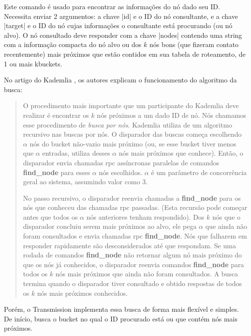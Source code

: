 
\newpage
{}

Este comando é usado para encontrar as informações do nó dado seu ID. Necessita enviar 2
argumentos: a chave \bverb|id| e o ID do nó consultante, e a chave \bverb|target| e o ID
do nó cujas informações o consultante está procurando (ou nó alvo). O nó consultado
deve responder com a chave \bverb|nodes| contendo uma \gls*{string} com a informação
compacta do nó alvo ou dos $k$ nós bons (que fizeram contato recentemente) mais
próximos que estão contidos em sua tabela de roteamento, de 1 ou mais \glspl*{kbucket}.

No artigo do Kademlia \cite{artigo:kademlia}, os autores explicam o funcionamento do
algoritmo da busca:

\blockquote{O procedimento mais importante que um participante do Kademlia deve realizar
é encontrar os $k$ nós próximos a um dado ID de nó. Nós chamamos esse procedimento de
\emph{busca por nós}. Kademlia utiliza de um algoritmo recursivo nas buscas por nós. O
disparador das buscas começa escolhendo $\alpha$ nós do \gls*{bucket} não-vazio mais
próximo (ou, se esse \gls*{bucket} tiver menos que $\alpha$ entradas, utiliza desses
$\alpha$ nós mais próximos que conhece). Então, o disparador envia chamadas \gls*{rpc}
assíncronas paralelas de comandos \textbf{find\_node} para esses $\alpha$ nós
escolhidos. $\alpha$ é um parâmetro de concorrência geral ao sistema, assumindo valor
como 3.

No passo recursivo, o disparador reenvia chamadas a \textbf{find\_node} para os nós que
conheceu das chamadas \gls*{rpc} passadas. (Esta recursão pode começar antes que todos
os $\alpha$ nós anteriores tenham respondido). Dos $k$ nós que o disparador concluiu
serem mais próximos ao alvo, ele pega $\alpha$ que ainda não foram consultados e envia
chamadas \gls*{rpc} \textbf{find\_node}. Nós que falharem em responder rapidamente são
desconsiderados até que respondam. Se uma rodada de comandos \textbf{find\_node} não
retornar algum nó mais próximo do que os nós já conhecidos, o disparador reenvia
comandos \textbf{find\_node} para todos os $k$ nós mais próximos que ainda não foram
consultados. A busca termina quando o disparador tiver consultado e obtido respostas de
todos os $k$ nós mais próximos conhecidos.}

Porém, o Transmission implementa essa busca de forma mais flexível e simples. De início,
busca o \gls*{bucket} no qual o ID procurado está ou que contém nós mais próximos.

